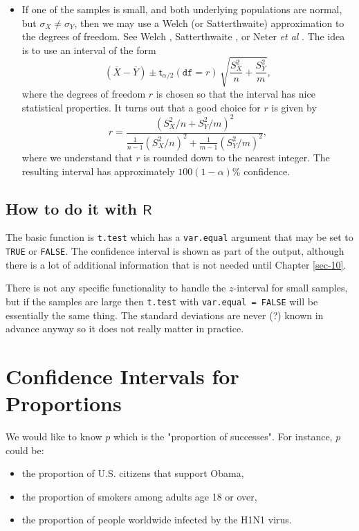 \begin{itemize}
\begin{itemize}
\item If one of the samples is small, and both underlying populations
are normal, but \(\sigma_{X}\neq\sigma_{Y}\), then we may use a
Welch (or Satterthwaite) approximation to the degrees of
freedom. See Welch \cite{Welch1947}, Satterthwaite
\cite{Satterthwaite1946}, or Neter \emph{et al} \cite{Neter1996}. The
idea is to use an interval of the form
\begin{equation}
\left(\overline{X}-\overline{Y}\right)\pm\mathsf{t}_{\alpha/2}(\mathtt{df}=r)\,\sqrt{\frac{S_{X}^{2}}{n}+\frac{S_{Y}^{2}}{m}},
\end{equation}
where the degrees of freedom \(r\) is chosen so that the
interval has nice statistical properties. It turns out that a
good choice for \(r\) is given by
\begin{equation}
r=\frac{\left(S_{X}^{2}/n+S_{Y}^{2}/m\right)^{2}}{\frac{1}{n-1}\left(S_{X}^{2}/n\right)^{2}+\frac{1}{m-1}\left(S_{Y}^{2}/m\right)^{2}},
\end{equation}
where we understand that \(r\) is rounded down to the nearest
integer. The resulting interval has approximately
\(100(1-\alpha)\%\) confidence.
\end{itemize}
\end{itemize}

\subsection{How to do it with \(\mathsf{R}\)}
\label{sec-9-3-1}

The basic function is \texttt{t.test} which has a \texttt{var.equal} argument that
may be set to \texttt{TRUE} or \texttt{FALSE}. The confidence interval is shown as
part of the output, although there is a lot of additional information
that is not needed until Chapter \ref{sec-10}.

There is not any specific functionality to handle the \(z\)-interval
for small samples, but if the samples are large then \texttt{t.test} with
\texttt{var.equal = FALSE} will be essentially the same thing. The standard
deviations are never (?) known in advance anyway so it does not really
matter in practice.

\section{Confidence Intervals for Proportions}
\label{sec-9-4}

We would like to know \(p\) which is the "proportion of
successes". For instance, \(p\) could be:
\begin{itemize}
\item the proportion of U.S. citizens that support Obama,
\item the proportion of smokers among adults age 18 or over,
\item the proportion of people worldwide infected by the H1N1 virus.
\end{itemize}

